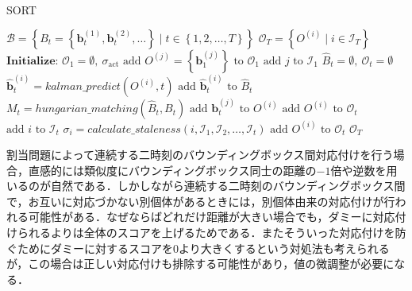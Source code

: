     \begin{algorithm}[t]
        \caption[SORT]{SORT}
        \label{alg:sort}
        \begin{algorithmic}[1]
            \Require $\mathcal{B} = \left\{B_t = \left\{\bm{b}_t^{(1)}, \bm{b}_t^{(2)}, \dots\right\} \mid t \in \left\{1, 2, \dots, T\right\}\right\}$
            \Ensure $\mathcal{O}_T = \left\{O^{(i)} \mid i \in \mathcal{I}_T\right\}$
            \State $\textbf{Initialize: } \mathcal{O}_{1} = \emptyset,\ \sigma_{\text{act}}$
                \State $\text{add } O^{(j)} = \left\{\bm{b}_1^{(j)}\right\} \text{ to } \mathcal{O}_{1}$
                \State $\text{add } j \text{ to }\mathcal{I}_1 $
            \EndFor
                \State $\hat{B}_t = \emptyset,\ \mathcal{O}_t = \emptyset$
                    \State $\hat{\bm{b}}_t^{(i)} = kalman\_predict(O^{(i)}, t)$
                    \State $\text{add } \hat{\bm{b}}_t^{(i)} \text{ to }\hat{B}_t $
                \EndFor
                \State $M_t = hungarian\_matching(\hat{B}_t, B_t)$
                    \State $\text{add } \bm{b}_t^{(j)} \text{ to } O^{(i)}$
                    \State $\text{add } O^{(i)} \text{ to } \mathcal{O}_t$
                    \State $\text{add } i \text{ to } \mathcal{I}_t$
                \EndFor
                    \State $\sigma_i = calculate\_staleness(i, \mathcal{I}_1, \mathcal{I}_2, \dots, \mathcal{I}_t)$
                        \State $\text{add } O^{(i)} \text{ to } \mathcal{O}_t$
                    \EndIf
                \EndFor
            \EndFor
            \State \Return $\mathcal{O}_{T}$
        \end{algorithmic}
    \end{algorithm}

    割当問題によって連続する二時刻のバウンディングボックス間対応付けを行う場合，直感的には類似度にバウンディングボックス同士の距離の$-1$倍や逆数を用いるのが自然である．しかしながら連続する二時刻のバウンディングボックス間で，お互いに対応づかない別個体があるときには，別個体由来の対応付けが行われる可能性がある．なぜならばどれだけ距離が大きい場合でも，ダミーに対応付けられるよりは全体のスコアを上げるためである．またそういった対応付けを防ぐためにダミーに対するスコアを$0$より大きくするという対処法も考えられるが，この場合は正しい対応付けも排除する可能性があり，値の微調整が必要になる．


